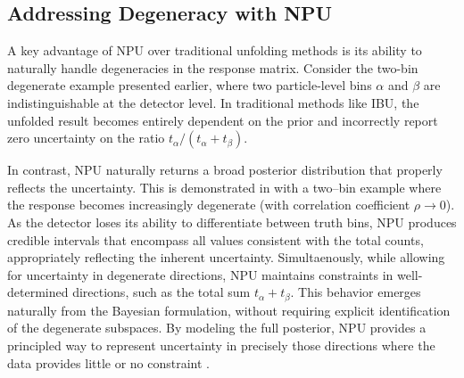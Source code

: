 \subsection{Addressing Degeneracy with NPU}
    A key advantage of NPU over traditional unfolding methods is its ability to naturally handle degeneracies in the response matrix.
    Consider the two-bin degenerate example presented earlier, where two particle-level bins $\alpha$ and $\beta$ are indistinguishable at the detector level.
    In traditional methods like IBU, the unfolded result becomes entirely dependent on the prior and incorrectly report zero uncertainty on the ratio \(t_\alpha/(t_\alpha+t_\beta).\)

    In contrast, NPU naturally returns a broad posterior distribution that properly reflects the uncertainty.
    This is demonstrated in with a two--bin example where the response becomes increasingly degenerate (with correlation coefficient \(\rho\to 0\)).
    As the detector loses its ability to differentiate between truth bins, NPU produces credible intervals that encompass all values consistent with the total counts, appropriately reflecting the inherent uncertainty.
    Simultaenously, while allowing for uncertainty in degenerate directions, NPU maintains constraints in well-determined directions, such as the total sum $t_\alpha + t_\beta$.
    This behavior emerges naturally from the Bayesian formulation, without requiring explicit identification of the degenerate subspaces.
    By modeling the full posterior, NPU provides a principled way to represent uncertainty in precisely those directions where the data provides little or no constraint .

